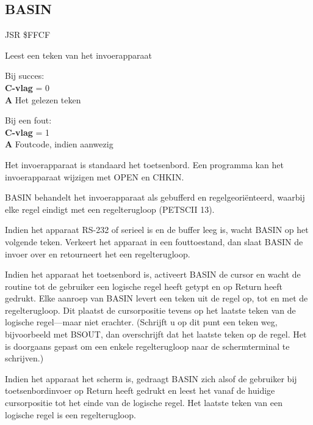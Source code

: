 
\newpage
\subsection{BASIN}
\label{KERNAL Jump Table!BASIN}
\begin{description}[leftmargin=2cm,style=nextline]
    \item [Adres:] JSR \$FFCF    \item [Omschrijving:] Leest een teken van het invoerapparaat    \item [Uitvoer:]        Bij succes: \\        \textbf{C-vlag} = 0 \\        \textbf{A} Het gelezen teken

        Bij een fout: \\        \textbf{C-vlag} = 1 \\        \textbf{A} Foutcode, indien aanwezig    \item [Opmerkingen:]        Het invoerapparaat is standaard het toetsenbord. Een programma kan het invoerapparaat wijzigen met OPEN en CHKIN.

        BASIN behandelt het invoerapparaat als gebufferd en regelgeoriënteerd, waarbij elke regel eindigt met een regelterugloop (PETSCII 13).

        Indien het apparaat RS-232 of serieel is en de buffer leeg is, wacht BASIN op het volgende teken. Verkeert het apparaat in een fouttoestand, dan slaat BASIN de invoer over en retourneert het een regelterugloop.

        Indien het apparaat het toetsenbord is, activeert BASIN de cursor en wacht de routine tot de gebruiker een logische regel heeft getypt en op Return heeft gedrukt. Elke aanroep van BASIN levert een teken uit de regel op, tot en met de regelterugloop. Dit plaatst de cursorpositie tevens op het laatste teken van de logische regel---maar niet erachter. (Schrijft u op dit punt een teken weg, bijvoorbeeld met BSOUT, dan overschrijft dat het laatste teken op de regel. Het is doorgaans gepast om een enkele regelterugloop naar de schermterminal te schrijven.)

        Indien het apparaat het scherm is, gedraagt BASIN zich alsof de gebruiker bij toetsenbordinvoer op Return heeft gedrukt en leest het vanaf de huidige cursorpositie tot het einde van de logische regel. Het laatste teken van een logische regel is een regelterugloop.


\end{description}
